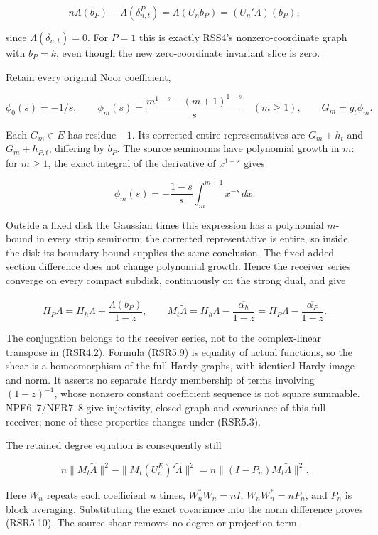 \[
n\Lambda(b_P)-\Lambda(\delta^P_{n,t})
=\Lambda(U_nb_P)=(U_n'\Lambda)(b_P),
\tag{RSR5.6}
\]

since \(\Lambda(\delta_{n,t})=0\). For \(P=1\) this is exactly RSS4's
nonzero-coordinate graph with \(b_P=k\), even though the new
zero-coordinate invariant slice is zero.

Retain every original Noor coefficient,

\[
\phi_0(s)=-1/s,\qquad
\phi_m(s)=\frac{m^{1-s}-(m+1)^{1-s}}s\quad(m\ge1),
\qquad G_m=g_t\phi_m.
\tag{RSR5.7}
\]

Each \(G_m\in E\) has residue \(-1\). Its corrected entire
representatives are \(G_m+h_t\) and \(G_m+h_{P,t}\), differing by
\(b_P\). The source seminorms have polynomial growth in \(m\): for
\(m\ge1\), the exact integral of the derivative of \(x^{1-s}\) gives

\[
\phi_m(s)=-\frac{1-s}{s}\int_m^{m+1}x^{-s}\,dx.
\tag{RSR5.8}
\]

Outside a fixed disk the Gaussian times this expression has a polynomial
\(m\)-bound in every strip seminorm; the corrected representative is
entire, so inside the disk its boundary bound supplies the same
conclusion. The fixed added section difference does not change
polynomial growth. Hence the receiver series converge on every compact
subdisk, continuously on the strong dual, and give

\[
H_P\Lambda=H_h\Lambda+\frac{\overline{\Lambda(b_P)}}{1-z},
\qquad
M_t\widetilde\Lambda
=H_h\Lambda-\frac{\overline{\alpha_h}}{1-z}
=H_P\Lambda-\frac{\overline{\alpha_P}}{1-z}.
\tag{RSR5.9}
\]

The conjugation belongs to the receiver series, not to the
complex-linear transpose in (RSR4.2). Formula (RSR5.9) is equality of
actual functions, so the shear is a homeomorphism of the full Hardy
graphs, with identical Hardy image and norm. It asserts no separate
Hardy membership of terms involving \((1-z)^{-1}\), whose nonzero
constant coefficient sequence is not square summable. NPE6--7/NER7--8
give injectivity, closed graph and covariance of this full receiver;
none of these properties changes under (RSR5.3).

The retained degree equation is consequently still

\[
n\|M_t\widetilde\Lambda\|^2-
\|M_t(U_n^E)'\widetilde\Lambda\|^2
=n\|(I-P_n)M_t\widetilde\Lambda\|^2.
\tag{RSR5.10}
\]

Here \(W_n\) repeats each coefficient \(n\) times, \(W_n^*W_n=nI\),
\(W_nW_n^*=nP_n\), and \(P_n\) is block averaging. Substituting the
exact covariance into the norm difference proves (RSR5.10). The source
shear removes no degree or projection term.

